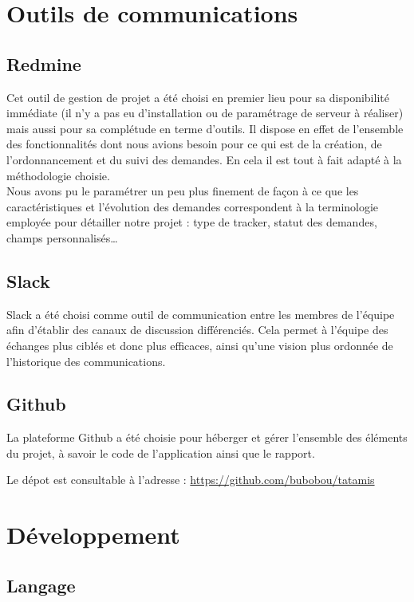 \section{Outils de communications}

\subsection{Redmine}

Cet outil de gestion de projet a été choisi en premier lieu pour sa disponibilité immédiate (il n'y a pas eu d'installation
ou de paramétrage de serveur à réaliser) mais aussi pour sa complétude en terme d'outils. Il dispose
en effet de l'ensemble des fonctionnalités dont nous avions besoin pour ce qui est de la création, de l'ordonnancement
et du suivi des demandes. En cela il est tout à fait adapté à la méthodologie choisie.\\

Nous avons pu le paramétrer un peu plus finement de façon à ce que les caractéristiques et l'évolution des demandes
correspondent à la terminologie employée pour détailler notre projet : type de tracker, statut des demandes, champs personnalisés\dots


\subsection{Slack}

Slack a été choisi comme outil de communication entre les membres de l'équipe afin d'établir des canaux de discussion différenciés. 
Cela permet à l'équipe des échanges plus ciblés et donc plus efficaces, ainsi qu'une vision plus ordonnée de l'historique des communications.

\subsection{Github}

La plateforme Github a été choisie pour héberger et gérer l'ensemble des éléments du projet, à savoir
le code de l'application ainsi que le rapport.

Le dépot est consultable à l'adresse : \url{https://github.com/bubobou/tatamis}

\section{Développement}

\subsection{Langage}

